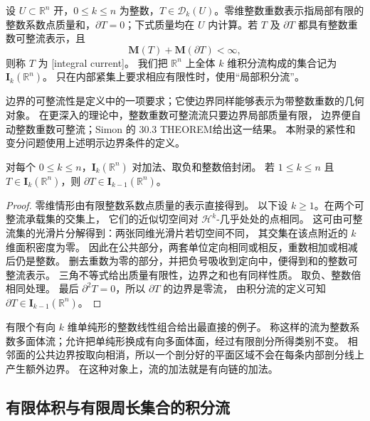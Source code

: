 \begin{definition}\label{b1:def:app-d-integral-current}
设 \(U\subset\mathbb R^n\) 开，\(0\le k\le n\) 为整数，\(T\in\mathcal D_k(U)\)。零维整数重数表示指局部有限的整数系数点质量和，\(\partial T=0\)；下式质量均在 \(U\) 内计算。若 \(T\) 及 \(\partial T\) 都具有整数重数可整流表示，且
\[
 \mathbf M(T)+\mathbf M(\partial T)<\infty,
\]
则称 \(T\) 为%
[integral current]。
我们把 \(\mathbb R^n\) 上全体 \(k\) 维积分流构成的集合记为 \(\mathbf I_k(\mathbb R^n)\)。
只在内部紧集上要求相应有限性时，使用“局部积分流”。
\end{definition}

边界的可整流性是定义中的一项要求；它使边界同样能够表示为带整数重数的几何对象。
在更深入的理论中，整数重数可整流流只要边界局部质量有限，
边界便自动整数重数可整流；Simon 的 30.3 THEOREM\cite[30.3 THEOREM]{Simon1983Lectures}给出这一结果。
本附录的紧性和变分问题使用上述明示边界条件的定义。

\begin{proposition}\label{b1:prop:app-d-integral-algebra}
对每个 \(0\leq k\leq n\)，\(\mathbf I_k(\mathbb R^n)\)
对加法、取负和整数倍封闭。
若 \(1\leq k\leq n\) 且 \(T\in\mathbf I_k(\mathbb R^n)\)，则
\(\partial T\in\mathbf I_{k-1}(\mathbb R^n)\)。
\end{proposition}
\begin{proof}
零维情形由有限整数系数点质量的表示直接得到。
以下设 \(k\geq1\)。在两个可整流承载集的交集上，
它们的近似切空间对 \(\mathcal H^k\)-几乎处处的点相同。
这可由可整流集的光滑片分解得到：两张同维光滑片若切空间不同，
其交集在该点附近的 \(k\) 维面积密度为零。
因此在公共部分，两套单位定向相同或相反，重数相加或相减后仍是整数。
删去重数为零的部分，并把负号吸收到定向中，便得到和的整数可整流表示。
三角不等式给出质量有限性，边界之和也有同样性质。
取负、整数倍相同处理。
最后 \(\partial^2T=0\)，所以 \(\partial T\) 的边界是零流，
由积分流的定义可知 \(\partial T\in\mathbf I_{k-1}(\mathbb R^n)\)。
\end{proof}

有限个有向 \(k\) 维单纯形的整数线性组合给出最直接的例子。
称这样的流为整数系数多面体流；允许把单纯形换成有向多面体面，经过有限剖分所得类别不变。
相邻面的公共边界按取向相消，所以一个剖分好的平面区域不会在每条内部剖分线上产生额外边界。
在这种对象上，流的加法就是有向链的加法。

\subsection{有限体积与有限周长集合的积分流}
\label{b1:subsec:D10302}

